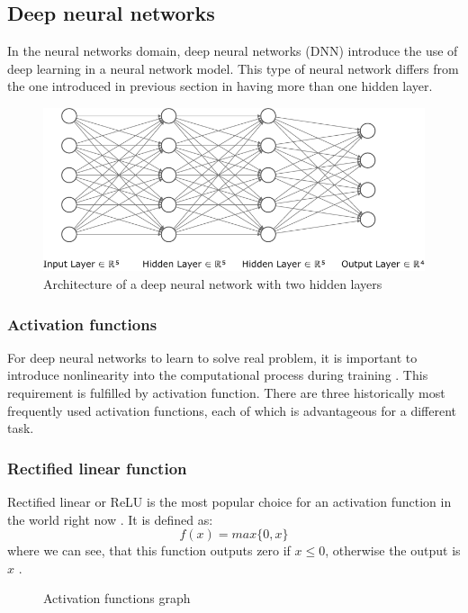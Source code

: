 \subsection{Deep neural networks}
In the neural networks domain, deep neural networks (DNN) introduce the use of deep learning in a neural network model. This type of neural network differs from the one introduced in previous section in having more than one hidden layer. 
\begin{figure}[!ht]
\centering
\includegraphics[width=12cm]{assets/images/DNN}
\caption{Architecture of a deep neural network with two hidden layers 
\label{fig:DNN}}
\end{figure}

\subsubsection{Activation functions}
For deep neural networks to learn to solve real problem, it is important to introduce nonlinearity into the computational process during training \cite{tutorialIEEE}. This requirement is fulfilled by activation function. There are three historically most frequently used activation functions, each of which is advantageous for a different task.
\subsubsection*{Rectified linear function}
Rectified linear or ReLU is the most popular choice for an activation function in the world right now \cite{tutorialIEEE}. It is defined as:
\begin{equation}
     f(x) = max\{0, x\}
\end{equation}
where we can see, that this function outputs zero if $x\leq0$, otherwise the output is $x$ \cite{deeplearningbook}. 
\begin{figure}[!ht]
\centering
{}
\caption{Activation functions graph
\label{fig:activationFunctions}}
\end{figure}

